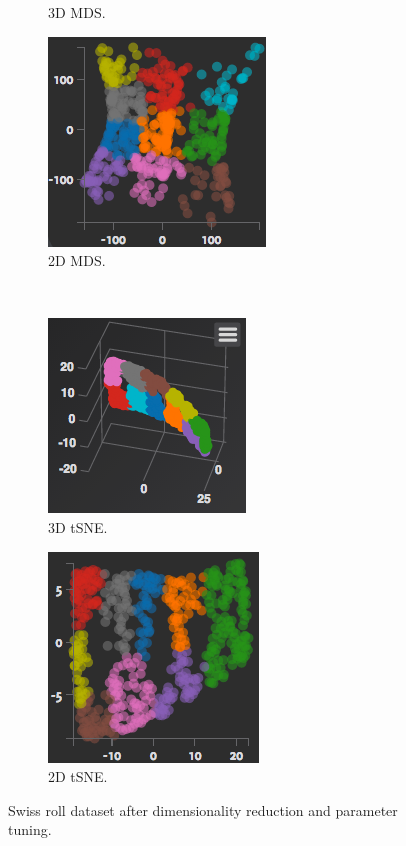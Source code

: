 \documentclass{sigchi}
\begin{document}
\begin{figure}
\begin{subfigure}{.49\columnwidth}
  \caption{3D MDS.}
\end{subfigure}%
\begin{subfigure}{.49\columnwidth}
  \centering
  \includegraphics[width=.5\columnwidth]{figures/MDS_2d}
  \caption{2D MDS.}
\end{subfigure}\\%
\begin{subfigure}{.49\columnwidth}
  \centering
  \includegraphics[width=.5\columnwidth]{figures/tSNE_3d}
  \caption{3D tSNE.}
\end{subfigure}%
\begin{subfigure}{.49\columnwidth}
  \centering
  \includegraphics[width=.5\columnwidth]{figures/tSNE_2d}
  \caption{2D tSNE.}
\end{subfigure}
\caption{Swiss roll dataset after dimensionality reduction and parameter tuning.}
\label{fig:double}
\end{figure}%
\end{document}
